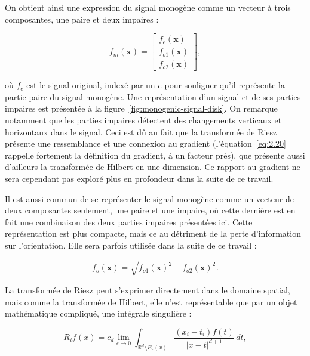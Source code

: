 On obtient ainsi une expression du signal monogène comme un vecteur à trois composantes, une paire et deux impaires :

\begin{equation}
    f_m(\mathbf{x}) =
    \left[
        \begin{array}{c}
        f_e(\mathbf{x}) \\
        f_{o1}(\mathbf{x}) \\
        f_{o2}(\mathbf{x})
        \end{array}
    \right],
\end{equation}

où $f_e$ est le signal original, indexé par un $e$ pour souligner qu'il représente la partie paire du signal monogène. Une représentation d'un signal et de ses parties impaires est présentée à la figure~\ref{fig:monogenic-signal-disk}. On remarque notamment que les parties impaires détectent des changements verticaux et horizontaux dans le signal. Ceci est dû au fait que la transformée de Riesz présente une ressemblance et une connexion au gradient (l'équation~\ref{eq:2.20} rappelle fortement la définition du gradient, à un facteur près), que présente aussi d'ailleurs la transformée de Hilbert en une dimension. Ce rapport au gradient ne sera cependant pas exploré plus en profondeur dans la suite de ce travail.

\bigskip

Il est aussi commun de se représenter le signal monogène comme un vecteur de deux composantes seulement, une paire et une impaire, où cette dernière est en fait une combinaison des deux parties impaires présentées ici. Cette représentation est plus compacte, mais ce au détriment de la perte d'information sur l'orientation. Elle sera parfois utilisée dans la suite de ce travail :

\begin{equation}
    f_o(\mathbf{x}) = \sqrt{f_{o1}(\mathbf{x})^2 + f_{o2}(\mathbf{x})^2}.
\end{equation}

La transformée de Riesz peut s'exprimer directement dans le domaine spatial, mais comme la transformée de Hilbert, elle n'est représentable que par un objet mathématique compliqué, une intégrale singulière :

\begin{equation}
    R_if(x) = c_d \lim_{\epsilon \to 0}\int_{\mathbb{R}^d\setminus B_\epsilon(x)}\frac{(x_i-t_i)f(t)}{|x-t|^{d+1}}\,dt,
    \label{eq:riesz-transform-spatial}
\end{equation}


